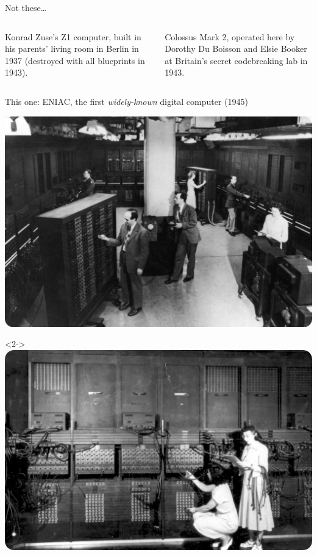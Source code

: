 \documentclass[aspectratio=169]{beamer}
\begin{document}
\begin{frame}{Not these\ldots}
\vspace{0.5 cm}
\begin{columns}[t]
Konrad Zuse's Z1 computer, built in his parents' living room in Berlin in 1937 (destroyed with all blueprints in 1943).

Colossus Mark 2, operated here by Dorothy Du Boisson and Elsie Booker at Britain's secret codebreaking lab in 1943.
\end{columns}
\end{frame}

\begin{frame}{This one: ENIAC, the first {\it widely-known} digital computer (1945)}
\vspace{0.35 cm}

\mbox{\hspace{-0.25 cm}\includegraphics[height=7.5 cm]{PLOTS/eniac-1.jpg}}

\begin{onlyenv}<2->
\vspace{-7.5 cm}
\mbox{\hspace{0.75 cm}\includegraphics[height=7.5 cm]{PLOTS/eniac-2.jpg}}
\end{onlyenv}


\end{frame}
\end{document}
